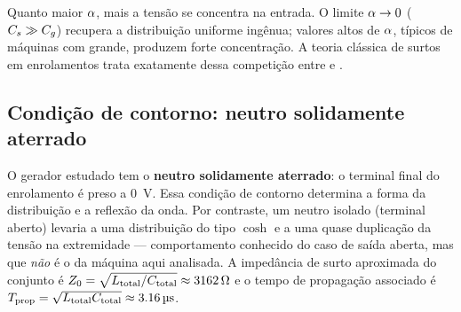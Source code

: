 Quanto maior \(\alpha\), mais a tensão se concentra na entrada. O limite \(\alpha \to 0\)
(\(C_s \gg C_g\)) recupera a distribuição uniforme ingênua; valores altos de \(\alpha\), típicos de
máquinas com \Cg{} grande, produzem forte concentração. A teoria clássica de surtos em enrolamentos
\cite{greenwood1991} trata exatamente dessa competição entre \Cg{} e \Cs.

\subsection{Condição de contorno: neutro solidamente aterrado}

O gerador estudado tem o \textbf{neutro solidamente aterrado}: o terminal final do enrolamento é preso
a \SI{0}{V}. Essa condição de contorno determina a forma da distribuição e a reflexão da onda. Por
contraste, um neutro isolado (terminal aberto) levaria a uma distribuição do tipo \(\cosh\) e a uma
quase duplicação da tensão na extremidade — comportamento conhecido do caso de saída aberta, mas que
\emph{não} é o da máquina aqui analisada. A impedância de surto aproximada do conjunto é
\(Z_0 = \sqrt{L_{\mathrm{total}}/C_{\mathrm{total}}} \approx \SI{3162}{\ohm}\) e o tempo de
propagação associado é \(T_{\mathrm{prop}} = \sqrt{L_{\mathrm{total}}C_{\mathrm{total}}} \approx
\SI{3.16}{\micro\second}\).
